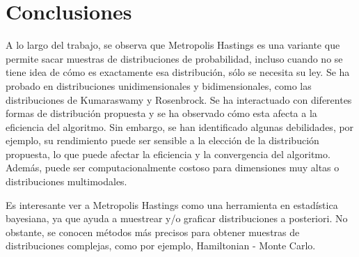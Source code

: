 \documentclass[
]{article}
\begin{document}
\hypertarget{conclusiones}{%
\section{Conclusiones}\label{conclusiones}}

A lo largo del trabajo, se observa que Metropolis Hastings es una
variante que permite sacar muestras de distribuciones de probabilidad,
incluso cuando no se tiene idea de cómo es exactamente esa distribución,
sólo se necesita su ley. Se ha probado en distribuciones
unidimensionales y bidimensionales, como las distribuciones de
Kumaraswamy y Rosenbrock. Se ha interactuado con diferentes formas de
distribución propuesta y se ha observado cómo esta afecta a la
eficiencia del algoritmo. Sin embargo, se han identificado algunas
debilidades, por ejemplo, su rendimiento puede ser sensible a la
elección de la distribución propuesta, lo que puede afectar la
eficiencia y la convergencia del algoritmo. Además, puede ser
computacionalmente costoso para dimensiones muy altas o distribuciones
multimodales.

Es interesante ver a Metropolis Hastings como una herramienta en
estadística bayesiana, ya que ayuda a muestrear y/o graficar
distribuciones a posteriori. No obstante, se conocen métodos más
precisos para obtener muestras de distribuciones complejas, como por
ejemplo, Hamiltonian - Monte Carlo.
\end{document}
